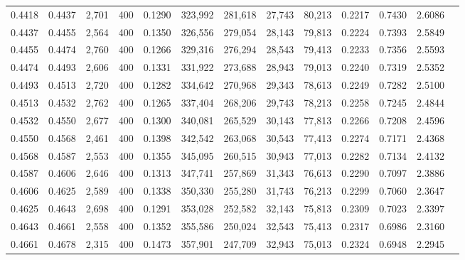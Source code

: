 \begin{tabular}{rrrrrrrrrrrrr}
0.4418 & 0.4437 &  2,701 & 400 &                                     0.1290 & 323,992 & 281,618 &  27,743 &  80,213 & 0.2217 & 0.7430 & 2.6086 \\
0.4437 & 0.4455 &  2,564 & 400 &                                     0.1350 & 326,556 & 279,054 &  28,143 &  79,813 & 0.2224 & 0.7393 & 2.5849 \\
0.4455 & 0.4474 &  2,760 & 400 &                                     0.1266 & 329,316 & 276,294 &  28,543 &  79,413 & 0.2233 & 0.7356 & 2.5593 \\
0.4474 & 0.4493 &  2,606 & 400 &                                     0.1331 & 331,922 & 273,688 &  28,943 &  79,013 & 0.2240 & 0.7319 & 2.5352 \\
0.4493 & 0.4513 &  2,720 & 400 &                                     0.1282 & 334,642 & 270,968 &  29,343 &  78,613 & 0.2249 & 0.7282 & 2.5100 \\
0.4513 & 0.4532 &  2,762 & 400 &                                     0.1265 & 337,404 & 268,206 &  29,743 &  78,213 & 0.2258 & 0.7245 & 2.4844 \\
0.4532 & 0.4550 &  2,677 & 400 &                                     0.1300 & 340,081 & 265,529 &  30,143 &  77,813 & 0.2266 & 0.7208 & 2.4596 \\
0.4550 & 0.4568 &  2,461 & 400 &                                     0.1398 & 342,542 & 263,068 &  30,543 &  77,413 & 0.2274 & 0.7171 & 2.4368 \\
0.4568 & 0.4587 &  2,553 & 400 &                                     0.1355 & 345,095 & 260,515 &  30,943 &  77,013 & 0.2282 & 0.7134 & 2.4132 \\
0.4587 & 0.4606 &  2,646 & 400 &                                     0.1313 & 347,741 & 257,869 &  31,343 &  76,613 & 0.2290 & 0.7097 & 2.3886 \\
0.4606 & 0.4625 &  2,589 & 400 &                                     0.1338 & 350,330 & 255,280 &  31,743 &  76,213 & 0.2299 & 0.7060 & 2.3647 \\
0.4625 & 0.4643 &  2,698 & 400 &                                     0.1291 & 353,028 & 252,582 &  32,143 &  75,813 & 0.2309 & 0.7023 & 2.3397 \\
0.4643 & 0.4661 &  2,558 & 400 &                                     0.1352 & 355,586 & 250,024 &  32,543 &  75,413 & 0.2317 & 0.6986 & 2.3160 \\
0.4661 & 0.4678 &  2,315 & 400 &                                     0.1473 & 357,901 & 247,709 &  32,943 &  75,013 & 0.2324 & 0.6948 & 2.2945 \\

\end{tabular}
